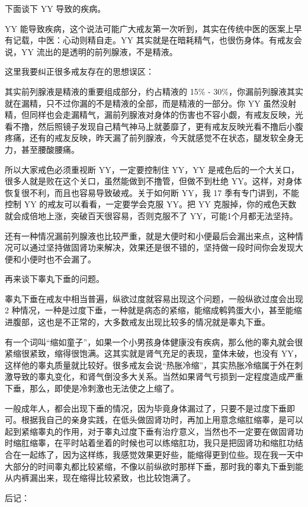 \documentclass{ctexart}
\begin{document}
下面谈下 YY 导致的疾病。

YY 能导致疾病，这个说法可能广大戒友第一次听到，其实在传统中医的医案上早有记载，中医：心动则精自走。YY 其实就是在暗耗精气，也很伤身体。有戒友会说，YY 流出的是透明的前列腺液，不是精液。

这里我要纠正很多戒友存在的思想误区：

其实前列腺液是精液的重要组成部分，约占精液的 15\% - 30\%，你漏前列腺液其实就在漏精，只不过你漏的不是精液的全部，而是精液的一部分。你 YY 虽然没射精，但同样也会走漏精气，漏前列腺液对身体的伤害也不容小觑，有戒友反映，光看不撸，然后照镜子发现自己精气神马上就萎靡了，更有戒友反映光看不撸后小腹疼痛，还有的戒友反映，昨天漏了前列腺液，今天就感觉不在状态，腿发软全身无力，甚至腰酸腰痛。

所以大家戒色必须重视断 YY，一定要控制住 YY，YY 是戒色后的一个大关口，很多人就是败在这个关口，虽然能做到不撸管，但做不到杜绝 YY。这样，对身体恢复很不利，而且也容易导致破戒。关于如何断 YY，我 17 季有专门讲到，不能控制 YY 的戒友可以看看，一定要学会克服 YY。把 YY 克服掉，你的戒色天数就会成倍地上涨，突破百天很容易，否则克服不了 YY，可能1个月都无法坚持。

还有一种情况漏前列腺液也比较严重，就是大便时和小便最后会漏出来点，这种情况可以通过坚持做固肾功来解决，效果还是很不错的，坚持做一段时间你会发现大便和小便时也不会漏了。

再来谈下睾丸下垂的问题。

睾丸下垂在戒友中相当普遍，纵欲过度就容易出现这个问题，一般纵欲过度会出现 2 种情况，一种是过度下垂，一种就是病态的紧缩，能缩成鹌鹑蛋大小，甚至能缩进腹部，这也是不正常的，大多数戒友出现比较多的情况就是睾丸下垂。

有一个词叫“缩如童子”，如果一个小男孩身体健康没有疾病，那么他的睾丸就会很紧缩很紧致，缩得很饱满。这其实就是肾气充足的表现，童体未破，也没有 YY，这样他的睾丸质量就比较好。很多戒友会说“热胀冷缩”，其实热胀冷缩属于外在刺激导致的睾丸变化，和肾气倒没多大关系。当然如果肾气亏损到一定程度造成严重下垂，那么，即使是冷刺激也无法使之上缩了。

一般成年人，都会出现下垂的情况，因为毕竟身体漏过了，只要不是过度下垂即可。根据我自己的亲身实践，在低头做固肾功时，再加上用意念缩肛缩睾，是可以起到紧缩睾丸的作用，对于睾丸过度下垂有治疗意义，当然也不一定要在做固肾功时缩肛缩睾，在平时站着坐着的时候也可以练缩肛功，我只是把固肾功和缩肛功结合在一起练了，因为这样练，我感觉效果更好些，能缩得更到位些。现在我一天中大部分的时间睾丸都比较紧缩，不像以前纵欲时那样下垂，那时我的睾丸下垂到能从内裤漏出来，现在缩得比较紧致，也比较饱满了。

后记：
\end{document}
